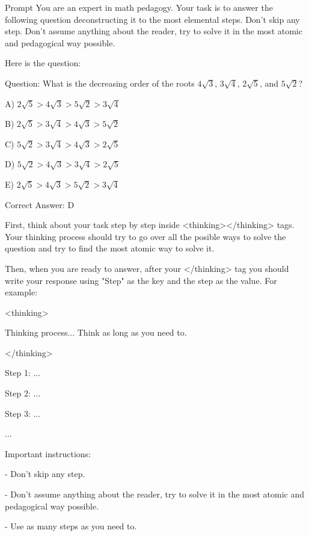 \documentclass[
    a4paper, %
    10pt, %
    twoside, %
]{LTJournalArticle}
\begin{document}
\begin{questionbox}{Prompt}
    You are an expert in math pedagogy. Your task is to answer the following question deconstructing it to the most elemental steps. Don't skip any step. Don't assume anything about the reader, try to solve it in the most atomic and pedagogical way possible.

    \vspace{1em}
  
    Here is the question:
    \vspace{1em}

    Question: What is the decreasing order of the roots $4\sqrt{3}$, $3\sqrt{4}$, $2\sqrt{5}$, and $5\sqrt{2}$?  

    A) $2\sqrt5 > 4\sqrt3 > 5\sqrt2 > 3\sqrt4$

    B) $2\sqrt5 > 3\sqrt4 > 4\sqrt3 > 5\sqrt2$

    C) $5\sqrt2 > 3\sqrt4 > 4\sqrt3 > 2\sqrt5$

    D) $5\sqrt2 > 4\sqrt3 > 3\sqrt4 > 2\sqrt5$

    E) $2\sqrt5 > 4\sqrt3 > 5\sqrt2 > 3\sqrt4$

    Correct Answer: D

    \vspace{1em}

    First, think about your task step by step inside <thinking></thinking> tags. Your thinking process should try to go over all the posible ways to solve the question and try to find the most atomic way to solve it.

    \vspace{1em}

    Then, when you are ready to answer, after your </thinking> tag you should write your response using "Step" as the key and the step as the value. For example:

    \vspace{1em}

    <thinking>

      Thinking process... Think as long as you need to.

    </thinking>

    \vspace{1em}

    Step 1: ...

    Step 2: ...

    Step 3: ...

    ...

    \vspace{1em}

    Important instructions:

    - Don't skip any step.
    
    - Don't assume anything about the reader, try to solve it in the most atomic and pedagogical way possible.

    - Use as many steps as you need to.
\end{questionbox}
\end{document}
